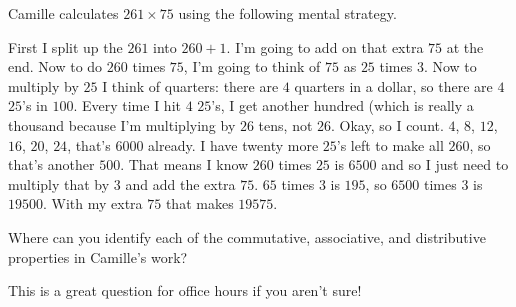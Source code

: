 \documentclass{ximera}
\begin{document}
\begin{example}
Camille calculates $261 \times 75$ using the following mental strategy.

First I split up the $261$ into $260 + 1$. I'm going to add on that extra $75$ at the end. Now to do $260$ times $75$, I'm going to think of $75$ as $25$ times $3$. Now to multiply by $25$ I think of quarters: there are $4$ quarters in a dollar, so there are $4$ $25$'s in $100$. Every time I hit $4$ $25$'s, I get another hundred (which is really a thousand because I'm multiplying by $26$ tens, not $26$. Okay, so I count. $4$, $8$, $12$, $16$, $20$, $24$, that's $6000$ already. I have twenty more $25$'s left to make all $260$, so that's another $500$. That means I know $260$ times $25$ is $6500$ and so I just need to multiply that by $3$ and add the extra $75$. $65$ times $3$ is $195$, so $6500$ times $3$ is $19500$. With my extra $75$ that makes $19575$.
\end{example}

\begin{question}
Where can you identify each of the commutative, associative, and distributive properties in Camille's work?
\begin{freeResponse}
This is a great question for office hours if you aren't sure!
\end{freeResponse}
\end{question}
\end{document}
